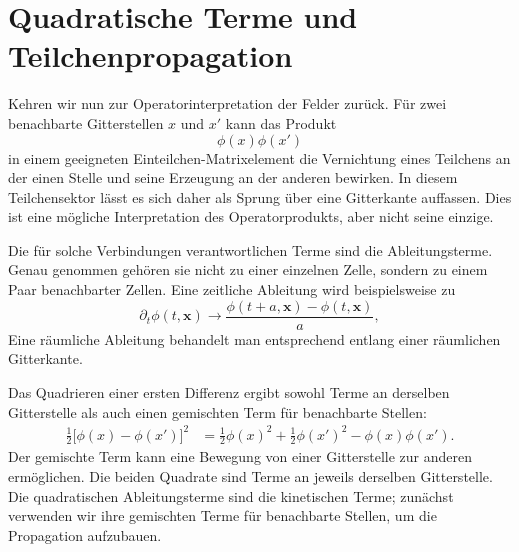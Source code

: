 \section{Quadratische Terme und Teilchenpropagation}

Kehren wir nun zur Operatorinterpretation der Felder zurück. Für zwei benachbarte Gitterstellen \(x\) und \(x'\) kann das Produkt
\begin{equation}
\phi(x)\phi(x')
\end{equation}
in einem geeigneten Einteilchen-Matrixelement die Vernichtung eines Teilchens an der einen Stelle und seine Erzeugung an der anderen bewirken. In diesem Teilchensektor lässt es sich daher als Sprung über eine Gitterkante auffassen. Dies ist eine mögliche Interpretation des Operatorprodukts, aber nicht seine einzige.

Die für solche Verbindungen verantwortlichen Terme sind die Ableitungsterme. Genau genommen gehören sie nicht zu einer einzelnen Zelle, sondern zu einem Paar benachbarter Zellen. Eine zeitliche Ableitung wird beispielsweise zu
\begin{equation}
\partial_t\phi(t,\mathbf{x})
\longrightarrow
\frac{\phi(t+a,\mathbf{x})-\phi(t,\mathbf{x})}{a},
\end{equation}
Eine räumliche Ableitung behandelt man entsprechend entlang einer räumlichen Gitterkante.

\begin{classroomqa}
\end{classroomqa}

Das Quadrieren einer ersten Differenz ergibt sowohl Terme an derselben Gitterstelle als auch einen gemischten Term für benachbarte Stellen:
\begin{align}
\frac{1}{2}\bigl[\phi(x)-\phi(x')\bigr]^2
&=
\frac{1}{2}\phi(x)^2
+\frac{1}{2}\phi(x')^2
-\phi(x)\phi(x').
\end{align}
Der gemischte Term kann eine Bewegung von einer Gitterstelle zur anderen ermöglichen. Die beiden Quadrate sind Terme an jeweils derselben Gitterstelle. Die quadratischen Ableitungsterme sind die kinetischen Terme; zunächst verwenden wir ihre gemischten Terme für benachbarte Stellen, um die Propagation aufzubauen.

